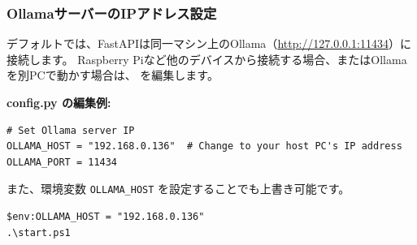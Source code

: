 \subsubsection{OllamaサーバーのIPアドレス設定}
デフォルトでは、FastAPIは同一マシン上のOllama（\url{http://127.0.0.1:11434}）に接続します。
Raspberry Piなど他のデバイスから接続する場合、またはOllamaを別PCで動かす場合は、 を編集します。

\textbf{config.py の編集例:}\\
\begin{lstlisting}[style=python]
# Set Ollama server IP
OLLAMA_HOST = "192.168.0.136"  # Change to your host PC's IP address
OLLAMA_PORT = 11434
\end{lstlisting}

また、環境変数 \texttt{OLLAMA\_HOST} を設定することでも上書き可能です。
\begin{lstlisting}[style=powershell]
$env:OLLAMA_HOST = "192.168.0.136"
.\start.ps1
\end{lstlisting}
